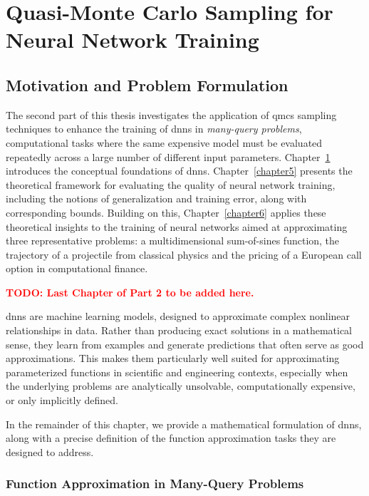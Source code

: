 \part{Quasi-Monte Carlo Sampling for Neural Network Training}
\label{part2}

\chapter{Motivation and Problem Formulation}
\label{chapter4}
The second part of this thesis investigates the application of \acfp{qmc}
sampling techniques to enhance the training of \acfp{dnn} in \emph{many-query
problems}, computational tasks where the same expensive model must be evaluated
repeatedly across a large number of different input parameters.
Chapter~\ref{chapter4} introduces the conceptual foundations of \acp{dnn}.
Chapter~\ref{chapter5} presents the theoretical framework for evaluating the
quality of neural network training, including the notions of generalization and
training error, along with corresponding bounds. Building on this,
Chapter~\ref{chapter6} applies these theoretical insights to the training of
neural networks aimed at approximating three representative problems: a
multidimensional sum-of-sines function, the trajectory of a projectile from
classical physics and the pricing of a European call option in computational
finance.

\textcolor{red}{\textbf{TODO: Last Chapter of Part 2 to be added here.}}

\qquad

\acp{dnn} are machine learning models, designed to approximate complex nonlinear
relationships in data. Rather than producing exact solutions in a mathematical
sense, they learn from examples and generate predictions that often serve as
good approximations. This makes them particularly well suited for approximating
parameterized functions in scientific and engineering contexts, especially when
the underlying problems are analytically unsolvable, computationally expensive,
or only implicitly defined.

In the remainder of this chapter, we provide a mathematical formulation of
\acp{dnn}, along with a precise definition of the function approximation tasks
they are designed to address.

\section{Function Approximation in Many-Query Problems}
\label{sec:problem-setting}

